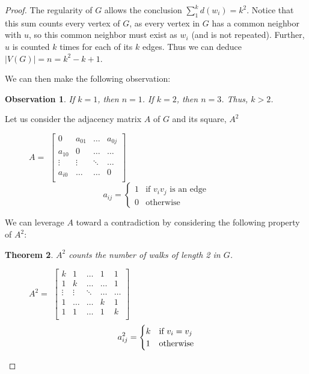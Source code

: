\documentclass{article}
\newtheorem{theorem}{Theorem}[section]
\newtheorem{observation}[theorem]{Observation}
\begin{document}
\begin{proof}
\bigskip

The regularity of $G$ allows the conclusion $\sum_1^kd(w_i)=k^2$. Notice that this sum counts every vertex of $G$, as every vertex in $G$ has a common neighbor with $u$, so this common neighbor must exist as $w_i$ (and is not repeated). Further, $u$ is counted $k$ times for each of its $k$ edges. Thus we can deduce $|V(G)| = n = k^2 - k + 1$.

We can then make the following observation: 
\begin{observation}
\label{obs:kgr2}
If $k=1$, then $n=1$. If $k=2$, then $n=3$.  Thus, $k > 2$.

\end{observation}  

Let us consider the adjacency matrix $A$ of $G$ and its square, $A^2$

\begin{figure}[ht]
\centering
$A = $
    $\begin{bmatrix}
        0         & a_{01}      & \dots     & a_{0j}       \\
        a_{10}    & 0           & \dots     & \dots        \\
        \vdots    & \vdots      & \ddots    & \dots        \\
        a_{i0}    & \hdots      & \hdots    & 0           \\
    \end{bmatrix}$
\[
    a_{ij}= 
\begin{cases}
    1 & \text{if } v_i v_j  \text{ is an edge} \\
    0              & \text{otherwise}
\end{cases}
\]
\end{figure}

We can leverage $A$ toward a contradiction by considering the following property of $A^2$:

\begin{theorem}
\label{theorem:adjacency}
$A^2$ counts the number of walks of length 2 in $G$.
\end{theorem}

\begin{figure}[ht]
\centering
$A^2 = $
    $\begin{bmatrix}
        k         & 1           & \dots     & 1         & 1       \\
        1         & k           & \dots     & \dots     & 1    \\
        \vdots    & \vdots      & \ddots    & \dots     & \dots    \\
        1         & \hdots      & \hdots    & k         & 1      \\
        1         & 1           & \hdots    & 1        & k      \\
    \end{bmatrix}$
\[
    a^2_{ij}= 
\begin{cases}
    k & \text{if } $$v_i = v_j$$ \\
    1              & \text{otherwise}
\end{cases}
\]
\end{figure}


\end{proof}
\end{document}
